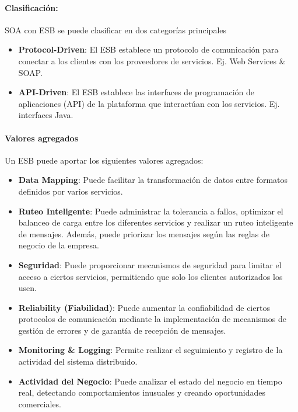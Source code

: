 \documentclass{article}
\begin{document}
		\paragraph{Clasificación:} SOA con ESB se puede clasificar en dos categorías principales
		\begin{itemize}		

			\item \textbf{Protocol-Driven}: El ESB establece un protocolo de comunicación para conectar a los clientes con los proveedores de servicios. Ej. Web Services \& SOAP.
			
			\item \textbf{API-Driven}: El ESB establece las interfaces de programación de aplicaciones (API) de la plataforma que interactúan con los servicios. Ej. interfaces Java.
			
		\end{itemize}
		
			
		\paragraph{Valores agregados} Un ESB puede aportar los siguientes valores agregados:
		\begin{itemize}		
			
			\item \textbf{Data Mapping}: Puede facilitar la transformación de datos entre formatos definidos por varios servicios.
			
			\item \textbf{Ruteo Inteligente}: Puede administrar la tolerancia a fallos, optimizar el balanceo de carga entre los diferentes servicios y realizar un ruteo inteligente de mensajes. Además, puede priorizar los mensajes según las reglas de negocio de la empresa.
			
						
			\item \textbf{Seguridad}: Puede proporcionar mecanismos de seguridad para limitar el acceso a ciertos servicios, permitiendo que solo los clientes autorizados los usen.
			
			
			\item \textbf{Reliability (Fiabilidad)}: Puede aumentar la confiabilidad de ciertos protocolos de comunicación mediante la implementación de mecanismos de gestión de errores y de garantía de recepción de mensajes.
			
						
			\item \textbf{Monitoring \& Logging}: Permite realizar el seguimiento y registro de la actividad del sistema distribuido.
			
			\item \textbf{Actividad del Negocio}: Puede analizar el estado del negocio en tiempo real, detectando comportamientos inusuales y creando oportunidades comerciales.
			
			
		\end{itemize}
		
\end{document}
